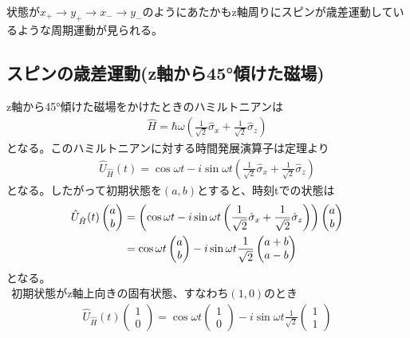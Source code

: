 \documentclass{jsarticle}  %
\numberwithin{equation}{section} %
\numberwithin{figure}{section}
\begin{document}
    状態が$x_+ \rightarrow y_+ \rightarrow x_- \rightarrow y_-$のようにあたかもz軸周りにスピンが歳差運動しているような周期運動が見られる。
\subsection{スピンの歳差運動(z軸から45°傾けた磁場)}
    z軸から45°傾けた磁場をかけたときのハミルトニアンは
    \begin{align}
        \hat{H} = \hbar \omega \left( \frac{1}{\sqrt{2}}\hat{\sigma}_x + \frac{1}{\sqrt{2}}\hat{\sigma}_z \right)
    \end{align}
    となる。このハミルトニアンに対する時間発展演算子は定理より
    \begin{align}
        \hat{U}_{\hat{H}}(t) = \cos \omega t -i\sin \omega t\left( \frac{1}{\sqrt{2}}\hat{\sigma}_x + \frac{1}{\sqrt{2}}\hat{\sigma}_z \right)
    \end{align}
    となる。したがって初期状態を$(a,b)$とすると、時刻tでの状態は
    \begin{align}
        \hat{U}_{\hat{H}}(t)
        \left(
        \begin{matrix}
            a\\
            b
        \end{matrix}
        \right)
        &= \left( \cos \omega t -i\sin \omega t\left( \frac{1}{\sqrt{2}}\hat{\sigma}_x + \frac{1}{\sqrt{2}}\hat{\sigma}_z \right) \right)
        \left(
        \begin{matrix}
            a\\
            b
        \end{matrix}
        \right) \notag \\
        &= \cos \omega t
        \left(
        \begin{matrix}
            a\\
            b
        \end{matrix}
        \right) - i\sin \omega t \frac{1}{\sqrt{2}}
        \left(
        \begin{matrix}
            a+b\\
            a-b
        \end{matrix}
        \right)
    \end{align}
    となる。\\
    $\ \ $初期状態がz軸上向きの固有状態、すなわち$(1,0)$のとき
    \begin{align}
        \hat{U}_{\hat{H}}(t)
        \left(
        \begin{matrix}
            1\\
            0
        \end{matrix}
        \right) = \cos \omega t
        \left(
        \begin{matrix}
            1\\
            0
        \end{matrix}
        \right) - i\sin \omega t \frac{1}{\sqrt{2}}
        \left(
        \begin{matrix}
            1\\
            1
        \end{matrix}
        \right)
    \end{align}
\end{document}
